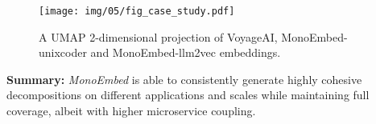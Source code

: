 \begin{figure*}[]
\centering
\texttt{[image: img/05/fig\_case\_study.pdf]}
\caption{A UMAP 2-dimensional projection of VoyageAI, MonoEmbed-unixcoder and MonoEmbed-llm2vec embeddings.} \label{fig:casestudy}
\end{figure*}

\begin{tcolorbox}[colback=gray!10!white, colframe=gray!90!black]
\textbf{Summary:} \textit{MonoEmbed} is able to consistently generate highly cohesive decompositions on different applications and scales while maintaining full coverage, albeit with higher microservice coupling.
\end{tcolorbox}











